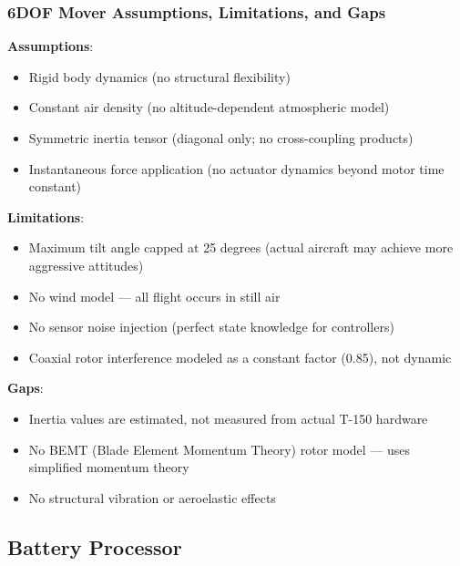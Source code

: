 \subsubsection{\unclass 6DOF Mover Assumptions, Limitations, and Gaps}\label{sec:6DOFALG}

\unclass \textbf{Assumptions}:
\begin{itemize}
	\item \unclass Rigid body dynamics (no structural flexibility)
	\item \unclass Constant air density (no altitude-dependent atmospheric model)
	\item \unclass Symmetric inertia tensor (diagonal only; no cross-coupling products)
	\item \unclass Instantaneous force application (no actuator dynamics beyond motor time constant)
\end{itemize}

\unclass \textbf{Limitations}:
\begin{itemize}
	\item \unclass Maximum tilt angle capped at 25 degrees (actual aircraft may achieve more aggressive attitudes)
	\item \unclass No wind model --- all flight occurs in still air
	\item \unclass No sensor noise injection (perfect state knowledge for controllers)
	\item \unclass Coaxial rotor interference modeled as a constant factor (0.85), not dynamic
\end{itemize}

\unclass \textbf{Gaps}:
\begin{itemize}
	\item \unclass Inertia values are estimated, not measured from actual T-150 hardware
	\item \unclass No BEMT (Blade Element Momentum Theory) rotor model --- uses simplified momentum theory
	\item \unclass No structural vibration or aeroelastic effects
\end{itemize}

\pagebreak


\subsection{\unclass Battery Processor}\label{sec:BatteryProcessor}

